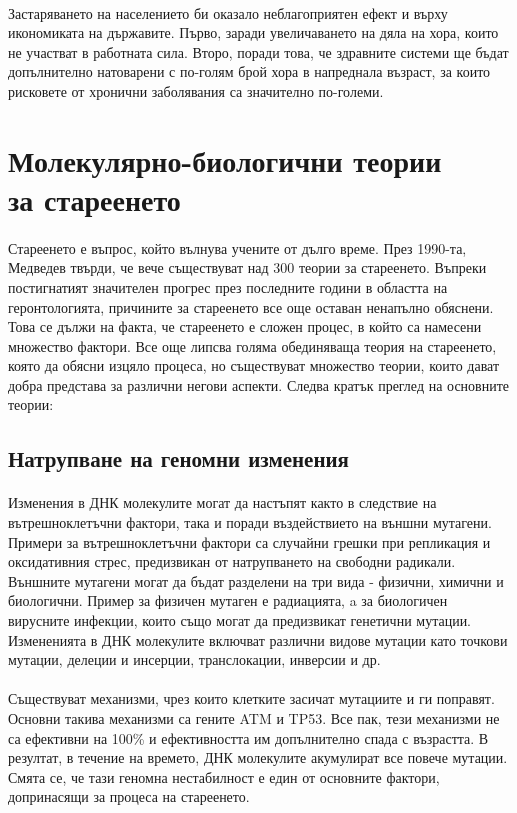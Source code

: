 \documentclass[pdftex,cyrillic,14pt,a4page,twoside]{extreport}
\begin{document}
\paragraph{}
Застаряването на населението би оказало неблагоприятен ефект и върху икономиката на държавите. Първо, заради увеличаването на дяла на хора, които не участват в работната сила. Второ, поради това, че здравните системи ще бъдат допълнително натоварени с по-голям брой хора в напреднала възраст, за които рисковете от хронични заболявания са значително по-големи.


\section{Молекулярно-биологични теории\\ за стареенето}
\paragraph{}
Стареенето е въпрос, който вълнува учените от дълго време. През 1990-та, Медведев твърди, че вече съществуват над 300 теории за стареенето\cite{medvedev1990}. Въпреки постигнатият значителен прогрес през последните години в областта на геронтологията, причините за стареенето все още оставан ненапълно обяснени. Това се дължи на факта, че стареенето е сложен процес, в който са намесени множество фактори. Все още липсва голяма обединяваща теория на стареенето, която да обясни изцяло процеса, но съществуват множество теории, които дават добра представа за различни негови аспекти\cite{vina2007}. Следва кратък преглед на основните теории:

\subsection{Натрупване на геномни изменения}
\paragraph{}
Изменения в ДНК молекулите могат да настъпят както в следствие на вътрешноклетъчни фактори, така и поради въздействието на външни мутагени. Примери за вътрешноклетъчни фактори са случайни грешки при репликация и оксидативния стрес, предизвикан от натрупването на свободни радикали\cite{wang1998}. Външните мутагени могат да бъдат разделени на три вида - физични, химични и биологични. Пример за физичен мутаген е радиацията\cite{breimer1988}, a за биологичен вирусните инфекции, които също могат да предизвикат генетични мутации. Измененията в ДНК молекулите включват различни видове мутации като точкови мутации, делеции и инсерции, транслокации, инверсии и др.\\\\
Съществуват механизми, чрез които клетките засичат мутациите и ги поправят. Основни такива механизми са гените ATM и TP53. Все пак, тези механизми не са ефективни на 100\% и ефективността им допълнително спада с възрастта\cite{auley2017}. В резултат, в течение на времето, ДНК молекулите акумулират все повече мутации. Смята се, че тази геномна нестабилност е един от основните фактори, допринасящи за процеса на стареенето\cite{vijg2013}.
\end{document}
